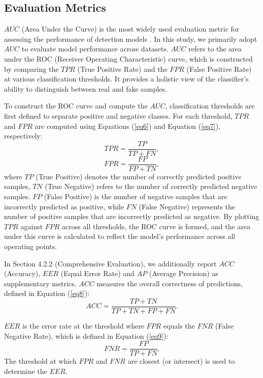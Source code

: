 \documentclass[final,5p,times]{elsarticle}
\begin{document}
\subsection{Evaluation Metrics}

$AUC$ (Area Under the Curve) is the most widely used evaluation metric for assessing the performance of detection models \cite{33}. In this study, we primarily adopt $AUC$ to evaluate model performance across datasets. $AUC$ refers to the area under the ROC (Receiver Operating Characteristic) curve, which is constructed by comparing the $TPR$ (True Positive Rate) and the $FPR$ (False Positive Rate) at various classification thresholds. It provides a holistic view of the classifier's ability to distinguish between real and fake samples.

To construct the ROC curve and compute the $AUC$, classification thresholds are first defined to separate positive and negative classes. For each threshold, $TPR$ and $FPR$ are computed using Equations (\ref{eq6}) and Equation (\ref{eq7}), respectively:
\begin{equation} \label{eq6}
TPR=\frac{TP}{TP+FN},
\end{equation}
\begin{equation} \label{eq7}
FPR=\frac{FP}{FP+TN},
\end{equation}
where $TP$ (True Positive)  denotes the number of correctly predicted positive samples, $TN$ (True Negative) refers to the number of correctly predicted negative samples. $FP$ (False Positive) is the number of negative samples that are incorrectly predicted as positive, while $FN$ (False Negative) represents the number of positive samples that are incorrectly predicted as negative. By plotting $TPR$ against $FPR$ across all thresholds, the ROC curve is formed, and the area under this curve is calculated to reflect the model's performance across all operating points.

In Section 4.2.2 (Comprehensive Evaluation), we additionally report $ACC$ (Accuracy), $EER$ (Equal Error Rate) and $AP$ (Average Precision) as supplementary metrics. $ACC$ measures the overall correctness of predictions, defined in  Equation (\ref{eq8}):
\begin{equation} \label{eq8}
ACC=\frac{TP+TN}{TP+TN+FP+FN}.
\end{equation}

$EER$ is the error rate at the threshold where $FPR$ equals the $FNR$ (False Negative Rate), which is defined in Equation (\ref{eq9}):
\begin{equation} \label{eq9}
FNR=\frac{FP}{TP+FN}.
\end{equation}
The threshold at which $FPR$ and $FNR$ are closest (or intersect) is used to determine the $EER$.
\end{document}
